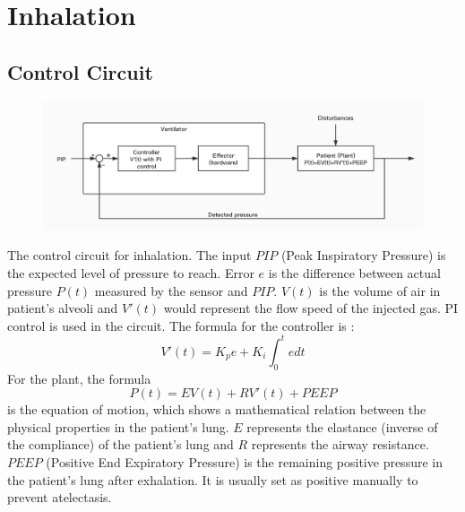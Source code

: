 \documentclass{article}
\begin{document}
\section{Inhalation}
\subsection{Control Circuit}
\begin{figure}[h]
\centering
\includegraphics[scale=0.23]{control-circuit.jpg}
\end{figure}

The control circuit for inhalation. The input $PIP$ (Peak Inspiratory Pressure) is the expected level of pressure to reach. Error $e$ is the difference between actual pressure $P(t)$ measured by the sensor and $PIP$. $V(t)$ is the volume of air in patient's alveoli and $V'(t)$ would represent the flow speed of the injected gas. PI control is used in the circuit. The formula for the controller is :
$$V'(t)=K_pe+K_i\int _0^tedt$$
For the plant, the formula
$$P(t)=EV(t)+RV'(t)+PEEP$$
is the equation of motion, which shows a mathematical relation between the physical properties in the patient's lung. $E$ represents the elastance (inverse of the compliance) of the patient's lung and $R$ represents the airway resistance. $PEEP$ (Positive End Expiratory Pressure) is the remaining positive pressure in the patient's lung after exhalation. It is usually set as positive manually to prevent atelectasis.

\newpage
\end{document}

